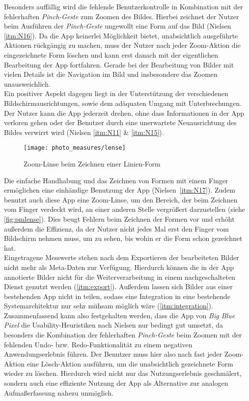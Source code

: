 Besonders auffällig wird die fehlende Benutzerkontrolle in Kombination mit der fehlerhaften \emph{Pinch-Geste} zum Zoomen des Bildes.
Hierbei zeichnet der Nutzer beim Ausführen der \emph{Pinch-Geste} ungewollt eine Form auf das Bild (Nielsen \autoref{itm:N16}).
Da die App keinerlei Möglichkeit bietet, unabsichtlich ausgeführte Aktionen rückgängig zu machen, muss der Nutzer nach jeder Zoom-Aktion die eingezeichnete Form löschen und kann erst danach mit der eigentlichen Bearbeitung der App fortfahren.
Gerade bei der Bearbeitung von Bilder mit vielen Details ist die Navigation im Bild und insbesondere das Zoomen unausweichlich. \\

Ein positiver Aspekt dagegen liegt in der Unterstützung der verschiedenen Bildschirmausrichtungen, sowie dem adäquaten Umgang mit Unterbrechungen.
Der Nutzer kann die App jederzeit drehen, ohne dass Informationen in der App verloren gehen oder der Benutzer durch eine unerwartete Neuausrichtung des Bildes verwirrt wird (Nielsen \autoref{itm:N11} \& \autoref{itm:N15}). \\

\begin{wrapfigure}{R}{0.4\textwidth}
  \centering
  \texttt{[image: photo\_measures/lense]}
  \caption{Zoom-Linse beim Zeichnen einer Linien-Form}
  \label{fig:pmlense}
\end{wrapfigure}

Die einfache Handhabung und das Zeichnen von Formen mit einem Finger ermöglichen eine einhändige Benutzung der App (Nielsen~\autoref{itm:N17}).
Zudem benutzt auch diese App eine Zoom-Linse, um den Bereich, der beim Zeichnen vom Finger verdeckt wird, an einer anderen Stelle vergrößert darzustellen (siehe \autoref{fig:pmlense}).
Dies beugt Fehlern beim Zeichnen der Formen vor und erhöht außerdem die Effizienz, da der Nutzer nicht jedes Mal erst den Finger vom Bildschirm nehmen muss, um zu sehen, bis wohin er die Form schon gezeichnet hat. \\

Eingetragene Messwerte stehen nach dem Exportieren der bearbeiteten Bilder nicht mehr als Meta-Daten zur Verfügung.
Hierdurch können die in der App annotierte Bilder nicht für die Weiterverarbeitung in einem nachgeschalteten Dienst genutzt werden (\autoref{itm:export}).
Außerdem lassen sich Bilder aus einer bestehenden App nicht in \pm{} teilen, sodass eine Integration in eine bestehende Systemarchitektur nur sehr mühsam möglich wäre (\autoref{itm:integration}). \\

Zusammenfassend kann also festgehalten werden, dass die App \pm{} von \emph{Big Blue Pixel} die Usability-Heuristiken nach Nielsen nur bedingt gut umsetzt, da besonders die Kombination der fehlerhaften \emph{Pinch-Geste} beim Zoomen mit der fehlenden Undo- bzw. Redo-Funktionalität zu einem negativen Anwendungserlebnis führen.
Der Benutzer muss hier also nach fast jeder Zoom-Aktion eine Lösch-Aktion ausführen, um die unabsichtlich gezeichnete Form wieder zu löschen.
Hierdurch wird nicht nur das Nutzungserlebnis geschmälert, sondern auch eine effiziente Nutzung der App als Alternative zur analogen Aufmaßerfassung nahezu unmöglich.
